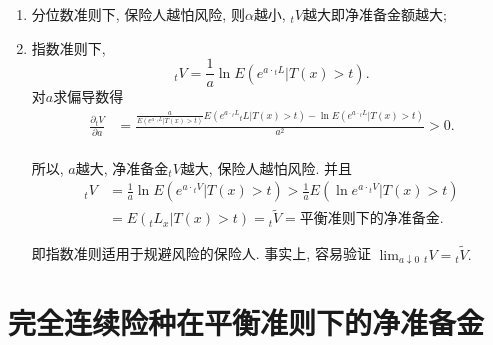 \documentclass[lang=cn,10pt]{elegantbook}
\begin{document}
\begin{remark}
    \begin{enumerate}
        \item 分位数准则下, 保险人越怕风险, 则$\alpha$越小, ${}_tV$越大即净准备金额越大;
        \item 指数准则下, $${}_tV=\frac{1}{a}\ln E(e^{a\cdot{}_tL}|T(x)>t).$$
              对$a$求偏导数得
              \begin{align*}
                  \frac{\partial {}_tV}{\partial a} & = \frac{\frac{a}{E(e^{a\cdot {}_tL}|T( x ) >t )}E( e^{a\cdot {}_tL}{}_tL|T( x ) >t )-\ln E( e^{a\cdot {}_tL}|T( x ) >t )}{a^2} >0. \\
              \end{align*}

              所以, $a$越大, 净准备金${}_tV$越大, 保险人越怕风险. 并且
              \begin{align*}
                  {}_tV & =\frac{1}{a}\ln E(e^{a\cdot{}_tV}|T(x)>t)>\frac{1}{a}E(\ln e^{ a\cdot {}_tV}|T(x)>t) \\
                        & =E(_tL_x|T(x)>t)={}_t\widetilde{V}=\text{平衡准则下的净准备金.}
              \end{align*}

              即指数准则适用于规避风险的保险人. 事实上, 容易验证 $\lim_{a\downarrow 0}{}_tV={}_t\widetilde{V}.$
    \end{enumerate}
\end{remark}

\section{完全连续险种在平衡准则下的净准备金}
\end{document}
